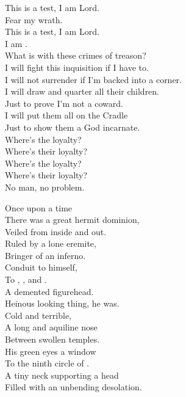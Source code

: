This is a test, I am Lord. \\
Fear my wrath. \\
This is a test, I am Lord. \\
I am . \\

What is with these crimes of treason? \\
I will fight this inquisition if I have to. \\
I will not surrender if I'm backed into a corner. \\
I will draw and quarter all their children. \\
Just to prove I'm not a coward. \\
I will put them all on the  Cradle \\
Just to show them a God incarnate. \\

Where's the loyalty? \\
Where's their loyalty? \\
Where's the loyalty? \\
Where's their loyalty? \\
No man, no problem. \\





Once upon a time \\
There was a great hermit dominion, \\
Veiled from inside and out. \\
Ruled by a lone eremite, \\
Bringer of an inferno. \\
Conduit to  himself, \\
To , , and . \\
A demented figurehead. \\

Heinous looking thing, he was. \\
Cold and terrible, \\
A long and aquiline nose \\
Between swollen temples. \\
His green eyes a window \\
To the ninth circle of . \\
A tiny neck supporting a head \\
Filled with an unbending desolation. \\

